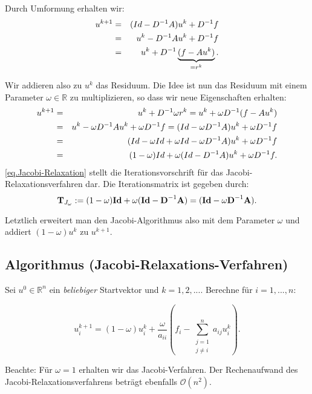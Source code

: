 Durch Umformung erhalten wir:
\begin{eqnarray}
u^{k+1} &=& (Id - D^{-1}A)u^{k} + D^{-1}f \notag \\
&=& u^{k} - D^{-1}Au^{k} + D^{-1}f \notag \\
&=& u^{k} + D^{-1} \underbrace{(f - Au^{k})}_{= r^{k}}.
\end{eqnarray}

Wir addieren also zu $u^{k}$ das Residuum. Die Idee ist nun das Residuum mit einem Parameter $\omega \in \mathbb{R}$ zu multiplizieren, so dass wir neue Eigenschaften erhalten:
\begin{eqnarray}
u^{k+1} &=& u^{k} + D^{-1} \omega r^{k} = u^{k} + \omega D^{-1} (f - Au^{k}) \notag \\
&=& u^{k} - \omega D^{-1} Au^{k} + \omega D^{-1}f = (Id - \omega D^{-1} A)u^{k} + \omega D^{-1}f \notag \\
&=& (Id - \omega Id + \omega Id - \omega D^{-1} A)u^{k} + \omega D^{-1}f \notag \\
&=& (1 - \omega)Id + \omega(Id - D^{-1}A) u^{k} + \omega D^{-1}f.\label{eq.Jacobi-Relaxation}
\end{eqnarray}
\autoref{eq.Jacobi-Relaxation} stellt die Iterationsvorschrift für das Jacobi-Relaxationsverfahren dar. Die Iterationsmatrix ist gegeben durch:
\begin{equation}
{\textbf{T}}_{J_{\omega}} := (1 - \omega) {\textbf{Id}} + \omega({\textbf{Id}} - {\textbf{D}}^{-1} {\textbf{A}}) = ({\textbf{Id}} - \omega {\textbf{D}}^{-1} {\textbf{A}}).
\end{equation}

Letztlich erweitert man den Jacobi-Algorithmus also mit dem Parameter $\omega$ und addiert $(1 - \omega)u^{k}$ zu $u^{k+1}$.

\subsection{Algorithmus (Jacobi-Relaxations-Verfahren)}\label{ss.Algorithmus Jacobi Relax}

Sei $u^{0} \in \mathbb{R}^{n}$ ein \textit{beliebiger} Startvektor und $k=1,2,...$. Berechne für $i=1,...,n$:

\begin{equation}
u^{k+1}_{i} = (1 - \omega)u^{k}_{i} + \frac {\omega} {a_{ii}} (f_{i} - \sum_{\substack{j = 1 \\ j \ne i}}^{n} a_{ij}u^{k}_{i}).
\end{equation}

Beachte: Für $\omega = 1$ erhalten wir das Jacobi-Verfahren. Der Rechenaufwand des Jacobi-Relaxationsverfahrens beträgt ebenfalls $\mathcal{O}(n^{2})$.

